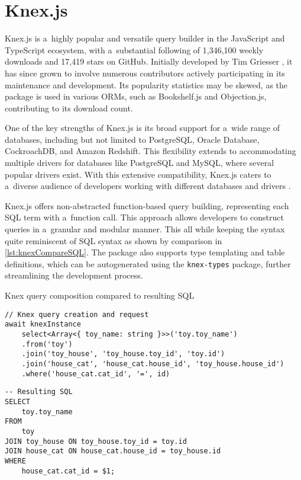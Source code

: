 \section{Knex.js}
Knex.js is a~highly popular and versatile query builder in the JavaScript and
TypeScript ecosystem, with a~substantial following of 1,346,100 weekly downloads
and 17,419 stars on GitHub. Initially developed by Tim Griesser
\cite{KnexCommits}, it has since grown to involve numerous contributors actively
participating in its maintenance and development. Its popularity statistics may
be skewed, as the package is used in various ORMs, such as Bookshelf.js and
Objection.js, contributing to its download count.

One of the key strengths of Knex.js is its broad support for a~wide range of
databases, including but not limited to PostgreSQL, Oracle Database,
CockroachDB, and Amazon Redshift. This flexibility extends to accommodating
multiple drivers for databases like PostgreSQL and MySQL, where several popular
drivers exist. With this extensive compatibility, Knex.js caters to a~diverse
audience of developers working with different databases and drivers
\cite{knexDocumentation}.

\newpage

Knex.js offers non-abstracted function-based query building, representing each
SQL term with a~function call. This approach allows developers to construct
queries in a~granular and modular manner. This all while keeping the syntax
quite reminiscent of SQL syntax as shown by comparison in
\autoref{lst:knexCompareSQL}. The package also supports type templating and
table definitions, which can be autogenerated using the \texttt{knex-types}
\cite{knexTypes} package, further streamlining the development process.

\begin{listing}
    \caption{Knex query composition compared to resulting SQL}
    \label{lst:knexCompareSQL}
\begin{verbatim}
// Knex query creation and request
await knexInstance
    select<Array<{ toy_name: string }>>('toy.toy_name')
    .from('toy')
    .join('toy_house', 'toy_house.toy_id', 'toy.id')
    .join('house_cat', 'house_cat.house_id', 'toy_house.house_id')
    .where('house_cat.cat_id', '=', id)
\end{verbatim} 

\vspace{-\medskipamount}
\vspace{-\baselineskip}

\begin{verbatim}
-- Resulting SQL
SELECT
    toy.toy_name
FROM
    toy
JOIN toy_house ON toy_house.toy_id = toy.id
JOIN house_cat ON house_cat.house_id = toy_house.id
WHERE
    house_cat.cat_id = $1;
\end{verbatim}    
\end{listing}

